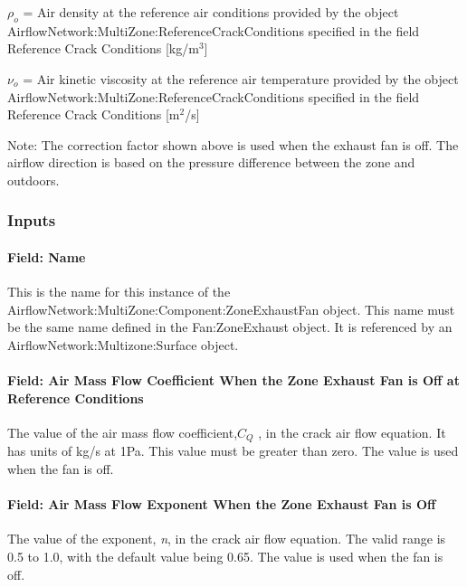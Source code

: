\(\rho_o\) = Air density at the reference air conditions provided by the object Air\-flow\-Net\-work:\-Multi\-Zone:\-Reference\-Crack\-Con\-ditions specified in the field Reference Crack Conditions {[}kg/m\(^{3}\){]}

\(\nu_o\) = Air kinetic viscosity at the reference air temperature provided by the object Air\-flow\-Net\-work:\-Multi\-Zone:\-Reference\-Crack\-Con\-ditions specified in the field Reference Crack Conditions {[}m\(^{2}\)/s{]}

Note: The correction factor shown above is used when the exhaust fan is off. The airflow direction is based on the pressure difference between the zone and outdoors.

\subsubsection{Inputs}\label{inputs-7-002}

\paragraph{Field: Name}\label{field-name-7-001}

This is the name for this instance of the Air\-flow\-Net\-work:\-Multi\-Zone:\-Com\-ponent:\-Zone\-Exhaust\-Fan object. This name must be the same name defined in the Fan:\-Zone\-Exhaust object. It is referenced by an Air\-flow\-Net\-work:\-Multi\-zone:\-Sur\-face object.

\paragraph{Field: Air Mass Flow Coefficient When the Zone Exhaust Fan is Off at Reference Conditions}\label{field-air-mass-flow-coefficient-when-the-zone-exhaust-fan-is-off-at-reference-conditions}

The value of the air mass flow coefficient,\({C_Q}\) , in the crack air flow equation. It has units of kg/s at 1Pa. This value must be greater than zero. The value is used when the fan is off.

\paragraph{Field: Air Mass Flow Exponent When the Zone Exhaust Fan is Off}\label{field-air-mass-flow-exponent-when-the-zone-exhaust-fan-is-off}

The value of the exponent, \emph{n}, in the crack air flow equation. The valid range is 0.5 to 1.0, with the default value being 0.65. The value is used when the fan is off.

